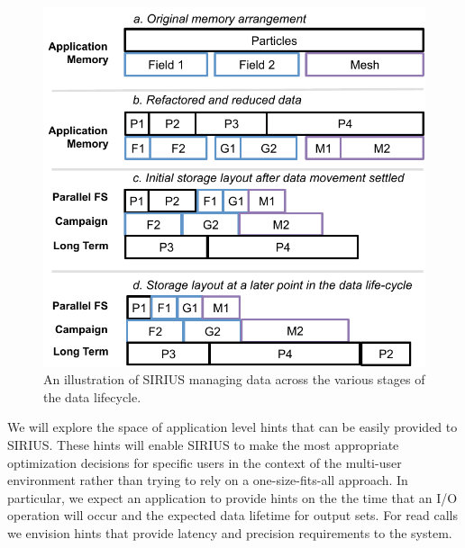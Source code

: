 \begin{figure}
        \begin{centering}
        \vspace{-4ex}
        \includegraphics[scale=0.7]{graphics/SSIO-bucket.pdf}
        \caption{An illustration of SIRIUS managing data across the various stages of the data lifecycle.}
        \label{fig:ssio-bucket}
        \end{centering}
      \vspace{-1ex}
\end{figure}

We will explore the space of application level hints that can be easily provided
to SIRIUS. These hints will enable SIRIUS to make the
most appropriate optimization decisions for specific users in the context of the
multi-user environment rather than trying to rely on a one-size-fits-all
approach. In particular, we expect an application to provide hints on the
the time that an I/O operation will occur and
the expected data lifetime for output sets. For read calls we envision
hints that provide latency and precision requirements to the system. 

